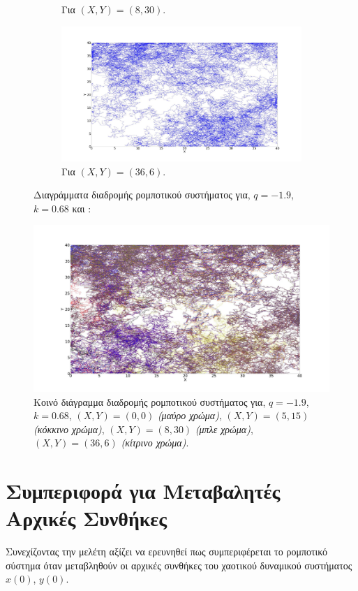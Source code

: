 \begin{figure}[ht]
\begin{subfigure}[b]{0.55\textwidth}
		\caption{Για $(X,Y) = (8,30)$.}
		\label{f:g90}
	\end{subfigure}
	\hfill
	\begin{subfigure}[b]{0.55\textwidth}
		\centering
		\includegraphics[width=\textwidth]{LateX images/log/XY1/g4-1.9}
		\caption{Για $(X,Y) = (36,6)$.}
		\label{f:g91}
	\end{subfigure}
	\hfill
	\caption{Διαγράμματα διαδρομής ρομποτικού συστήματος για, $q = -1.9$, $k = 0.68$ και :}
\end{figure}


\begin{figure}[ht]
	\centering
	\includegraphics[width=1\linewidth]{LateX images/log/XY1/g1}
	\caption{Κοινό διάγραμμα διαδρομής ρομποτικού συστήματος για, $q = -1.9$, $k = 0.68$, $(X,Y) = (0,0)$ \emph{(μαύρο χρώμα)}, $(X,Y) = (5,15)$ \emph{(κόκκινο χρώμα)}, $(X,Y) = (8,30)$ \emph{(μπλε χρώμα)}, $(X,Y) = (36,6)$ \emph{(κίτρινο χρώμα)}.}
	\label{f:g92}	
\end{figure}


\clearpage


\section{Συμπεριφορά για Μεταβαλητές Αρχικές Συνθήκες}
\label{sec:g3}
Συνεχίζοντας την μελέτη αξίζει να ερευνηθεί πως συμπεριφέρεται το ρομποτικό σύστημα όταν μεταβληθούν οι αρχικές συνθήκες του χαοτικού δυναμικού συστήματος $x(0)$, $y(0)$. 

